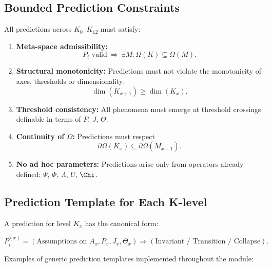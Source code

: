 \subsection{Bounded Prediction Constraints}

All predictions across $K_0$–$K_{12}$ must satisfy:

\begin{enumerate}
    \item \textbf{Meta-space admissibility:}  
    \[
    P_i \text{ valid} \ \Longrightarrow\ \exists M : \Omega(K)\subseteq\Omega(M).
    \]

    \item \textbf{Structural monotonicity:}  
    Predictions must not violate the monotonicity of axes, thresholds or  
    dimensionality:
    \[
    \dim(K_{x+1}) \ge \dim(K_x).
    \]

    \item \textbf{Threshold consistency:}  
    All phenomena must emerge at threshold crossings definable in terms of  
    $P$, $J$, $\Theta$.

    \item \textbf{Continuity of $\Omega$:}  
    Predictions must respect  
    \[
    \partial\Omega(K_x)\subseteq \partial\Omega(M_{x+1}).
    \]

    \item \textbf{No ad hoc parameters:}  
    Predictions arise only from operators already defined:  
    $\Psi$, $\Phi$, $\Lambda$, $U$, $\Chi$.
\end{enumerate}

\subsection{Prediction Template for Each K-level}

A prediction for level $K_x$ has the canonical form:

\[
P^{(x)}_i = 
\left(
\text{Assumptions on } A_x, P_x, J_x, \Theta_x
\right)
\Rightarrow
\left(
\text{Invariant / Transition / Collapse}
\right).
\]

Examples of generic prediction templates implemented throughout the module:

